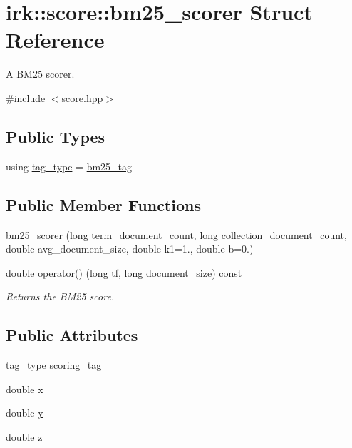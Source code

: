 \hypertarget{structirk_1_1score_1_1bm25__scorer}{}\section{irk\+:\+:score\+:\+:bm25\+\_\+scorer Struct Reference}
\label{structirk_1_1score_1_1bm25__scorer}


A B\+M25 scorer.  




{\ttfamily \#include $<$score.\+hpp$>$}

\subsection*{Public Types}
\begin{DoxyCompactItemize}
\item 
using \mbox{\hyperlink{structirk_1_1score_1_1bm25__scorer_ab99e02fc9ede9441ad9ee7a99077a720}{tag\+\_\+type}} = \mbox{\hyperlink{structirk_1_1score_1_1bm25__tag}{bm25\+\_\+tag}}
\end{DoxyCompactItemize}
\subsection*{Public Member Functions}
\begin{DoxyCompactItemize}
\item 
\mbox{\hyperlink{structirk_1_1score_1_1bm25__scorer_ab9150dc6a3574f9e5b67c5b0637fee26}{bm25\+\_\+scorer}} (long term\+\_\+document\+\_\+count, long collection\+\_\+document\+\_\+count, double avg\+\_\+document\+\_\+size, double k1=1., double b=0.)
\item 
double \mbox{\hyperlink{structirk_1_1score_1_1bm25__scorer_ab0a6fe27959c307bbc3288b0b92f9361}{operator()}} (long tf, long document\+\_\+size) const
\begin{DoxyCompactList}\small\item\em Returns the B\+M25 score. \end{DoxyCompactList}\end{DoxyCompactItemize}
\subsection*{Public Attributes}
\begin{DoxyCompactItemize}
\item 
\mbox{\hyperlink{structirk_1_1score_1_1bm25__scorer_ab99e02fc9ede9441ad9ee7a99077a720}{tag\+\_\+type}} \mbox{\hyperlink{structirk_1_1score_1_1bm25__scorer_a2dd5b1c82f311ec4a02446de5f4dc2bd}{scoring\+\_\+tag}}
\item 
double \mbox{\hyperlink{structirk_1_1score_1_1bm25__scorer_ae9c6a79715c86d4fbd91651b36f0b2a3}{x}}
\item 
double \mbox{\hyperlink{structirk_1_1score_1_1bm25__scorer_a2a76be6700391b2b1309d03abd845975}{y}}
\item 
double \mbox{\hyperlink{structirk_1_1score_1_1bm25__scorer_abb7948471b6e6e960b49d184f717f683}{z}}
\end{DoxyCompactItemize}


